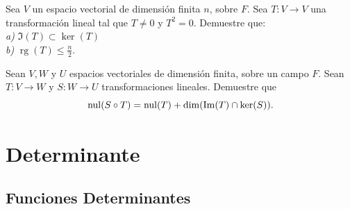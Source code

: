 \documentclass[12pt,a4paper]{book}
\newcommand{\rg}{\operatorname{rg}}
\begin{document}
    \begin{ejercicio}
        Sea $V$ un espacio vectorial de dimensión finita $n$, sobre $F$. Sea $T:V\to V$
        una transformación lineal tal que $T\neq 0$ y $T^{2}=0$. Demuestre que:\\
        \textit{a)} $\Im(T)\subset\ker(T)$\\
        \textit{b)} $\rg(T)\leq\frac{n}{2}$.
    \end{ejercicio}

    \begin{ejercicio}
        Sean $V,W$ y $U$ espacios vectoriales de dimensión finita, sobre un campo $F$. Sean $T:V\to W$ y $S:W\to U$ transformaciones lineales.
        Demuestre que
        \begin{equation*}
            \operatorname{nul}(S\circ T)=\operatorname{nul}(T)+\dim(\Im(T)\cap\ker(S)).
        \end{equation*}
    \end{ejercicio}

    \chapter{Determinante}

    \section{Funciones Determinantes}
\end{document}
